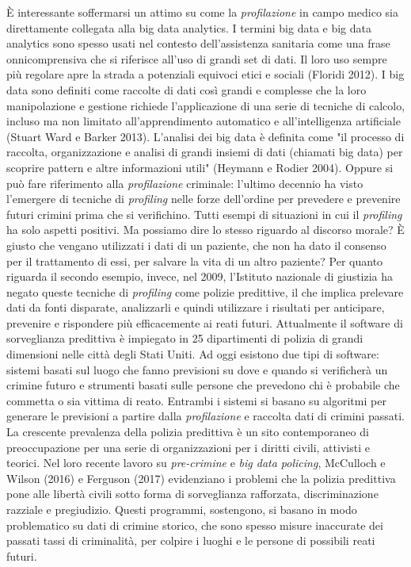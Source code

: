È interessante soffermarsi un attimo su come la \textit{profilazione} in campo medico sia direttamente collegata alla big data analytics. 
I termini big data e big data analytics sono spesso usati nel contesto dell'assistenza sanitaria come una frase onnicomprensiva che si riferisce all'uso di grandi set di dati. Il loro uso sempre più regolare apre la strada a potenziali equivoci etici e sociali (Floridi 2012). I big data sono definiti come raccolte di dati così grandi e complesse che la loro manipolazione e gestione richiede l'applicazione di una serie di tecniche di calcolo, incluso ma non limitato all'apprendimento automatico e all'intelligenza artificiale (Stuart Ward e Barker 2013). L'analisi dei big data è definita come "il processo di raccolta, organizzazione e analisi di grandi insiemi di dati (chiamati big data) per scoprire pattern e altre informazioni utili" (Heymann e Rodier 2004).
Oppure si può fare riferimento alla \textit{profilazione} criminale: l'ultimo decennio ha visto l'emergere di tecniche di \textit{profiling} nelle forze dell'ordine per prevedere e prevenire futuri crimini prima che si verifichino.
Tutti esempi di situazioni in cui il \textit{profiling} ha solo aspetti positivi. Ma possiamo dire lo stesso riguardo al discorso morale? 
È giusto che vengano utilizzati i dati di un paziente, che non ha dato il consenso per il trattamento di essi, per salvare la vita di un altro paziente?
Per quanto riguarda il secondo esempio, invece, nel 2009, l'Istituto nazionale di giustizia ha negato queste tecniche di \textit{profiling} come polizie predittive, il che implica prelevare dati da fonti disparate, analizzarli e quindi utilizzare i risultati per anticipare, prevenire e rispondere più efficacemente ai reati futuri. Attualmente il software di sorveglianza predittiva è impiegato in 25 dipartimenti di polizia di grandi dimensioni nelle città degli Stati Uniti. Ad oggi esistono due tipi di software: sistemi basati sul luogo che fanno previsioni su dove e quando si verificherà un crimine futuro e strumenti basati sulle persone che prevedono chi è probabile che commetta o sia vittima di reato. Entrambi i sistemi si basano su algoritmi per generare le previsioni a partire dalla \textit{profilazione} e raccolta dati di crimini passati.
La crescente prevalenza della polizia predittiva è un sito contemporaneo di preoccupazione per una serie di organizzazioni per i diritti civili, attivisti e teorici. Nel loro recente lavoro su \textit{pre-crimine} e \textit{big data policing}, McCulloch e Wilson (2016) e Ferguson (2017) evidenziano i problemi che la polizia predittiva pone alle libertà civili sotto forma di sorveglianza rafforzata, discriminazione razziale e pregiudizio. Questi programmi, sostengono, si basano in modo problematico su dati di crimine storico, che sono spesso misure inaccurate dei passati tassi di criminalità, per colpire i luoghi e le persone di possibili reati futuri.
